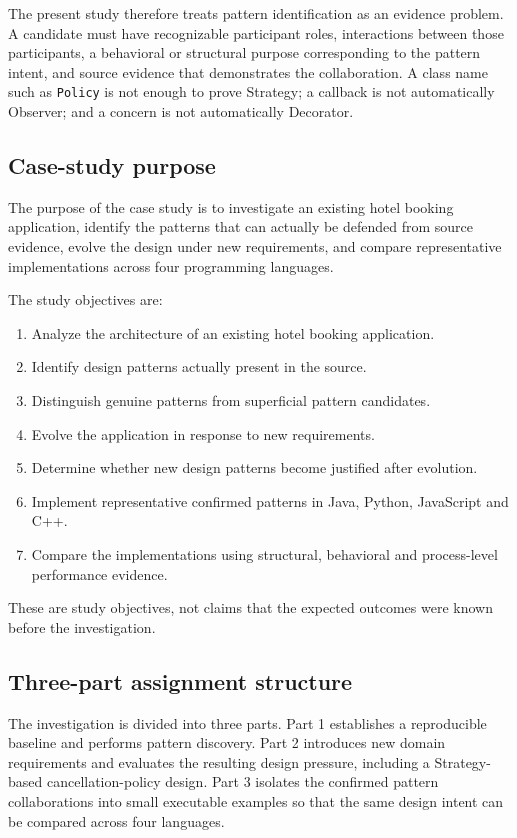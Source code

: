 \documentclass[10pt,a4paper]{article}
\newcommand{\code}[1]{\texttt{\small #1}}
\begin{document}
The present study therefore treats pattern identification as an evidence problem. A candidate must have recognizable participant roles, interactions between those participants, a behavioral or structural purpose corresponding to the pattern intent, and source evidence that demonstrates the collaboration. A class name such as \code{Policy} is not enough to prove Strategy; a callback is not automatically Observer; and a concern is not automatically Decorator.

\subsection{Case-study purpose}

The purpose of the case study is to investigate an existing hotel booking application, identify the patterns that can actually be defended from source evidence, evolve the design under new requirements, and compare representative implementations across four programming languages.

The study objectives are:

\begin{enumerate}[leftmargin=*]
\item Analyze the architecture of an existing hotel booking application.
\item Identify design patterns actually present in the source.
\item Distinguish genuine patterns from superficial pattern candidates.
\item Evolve the application in response to new requirements.
\item Determine whether new design patterns become justified after evolution.
\item Implement representative confirmed patterns in Java, Python, JavaScript and C++.
\item Compare the implementations using structural, behavioral and process-level performance evidence.
\end{enumerate}

These are study objectives, not claims that the expected outcomes were known before the investigation.

\subsection{Three-part assignment structure}

The investigation is divided into three parts. Part 1 establishes a reproducible baseline and performs pattern discovery. Part 2 introduces new domain requirements and evaluates the resulting design pressure, including a Strategy-based cancellation-policy design. Part 3 isolates the confirmed pattern collaborations into small executable examples so that the same design intent can be compared across four languages.
\end{document}
